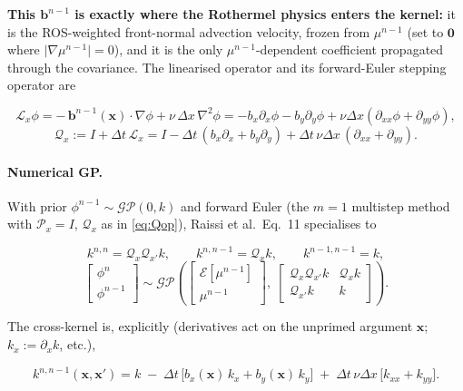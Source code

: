 \documentclass[11pt]{article}
\newcommand{\bx}{\mathbf{x}}
\newcommand{\bb}{\mathbf{b}}
\newcommand{\GP}{\mathcal{GP}}
\newcommand{\Lop}{\mathcal{L}}
\newcommand{\Qop}{\mathcal{Q}}
\begin{document}
\textbf{This $\bb^{n-1}$ is exactly where the Rothermel physics enters the kernel:}
it is the ROS-weighted front-normal advection velocity, frozen from $\mu^{n-1}$
(set to $\mathbf 0$ where $\lvert\nabla\mu^{n-1}\rvert=0$), and it is the only
$\mu^{n-1}$-dependent coefficient propagated through the covariance. The linearised
operator and its forward-Euler stepping operator are

\begin{equation}
  \label{eq:linop}
  \Lop_x\phi=-\,\bb^{n-1}(\bx)\cdot\nabla\phi+\nu\,\Delta x\,\nabla^{2}\phi
  =-b_x\partial_x\phi-b_y\partial_y\phi+\nu\Delta x(\partial_{xx}\phi+\partial_{yy}\phi),
\end{equation}
\begin{equation}
  \label{eq:Qop}
  \Qop_x:=I+\Delta t\,\Lop_x
  = I-\Delta t\,(b_x\partial_x+b_y\partial_y)+\Delta t\,\nu\Delta x\,(\partial_{xx}+\partial_{yy}).
\end{equation}

\paragraph{Numerical GP.}
With prior $\phi^{n-1}\sim\GP(0,k)$ and forward Euler (the $m\!=\!1$ multistep
method with $\mathcal P_x=I$, $\mathcal Q_x$ as in \eqref{eq:Qop}), Raissi et al.\
Eq.~11 specialises to

\begin{equation}
  \label{eq:blockkernels}
  k^{n,n}=\Qop_x\Qop_{x'}k,\qquad
  k^{n,n-1}=\Qop_x k,\qquad
  k^{n-1,n-1}=k,
\end{equation}
\begin{equation}
  \label{eq:joint-gp}
  \begin{bmatrix}\phi^{n}\\[2pt]\phi^{n-1}\end{bmatrix}
  \sim\GP\!\left(
  \begin{bmatrix}\mathcal{E}[\mu^{n-1}]\\[2pt]\mu^{n-1}\end{bmatrix},\;
  \begin{bmatrix}\Qop_x\Qop_{x'}k & \Qop_x k\\[2pt]\Qop_{x'}k & k\end{bmatrix}\right).
\end{equation}

The cross-kernel is, explicitly (derivatives act on the unprimed argument
$\bx$; $k_x:=\partial_x k$, etc.),

\begin{equation}
  \label{eq:knn1}
  k^{n,n-1}(\bx,\bx')
  = k\;-\;\Delta t\,\bigl[b_x(\bx)\,k_{x}+b_y(\bx)\,k_{y}\bigr]
  \;+\;\Delta t\,\nu\Delta x\,\bigl[k_{xx}+k_{yy}\bigr].
\end{equation}
\end{document}
